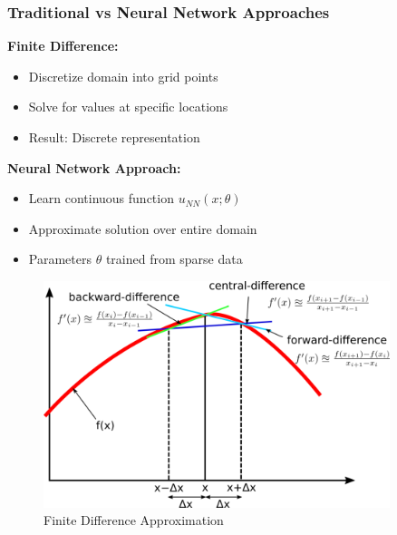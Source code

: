 \documentclass[notes]{beamer}
\begin{document}
\begin{frame}
\frametitle{Traditional vs Neural Network Approaches}

\begin{minipage}[t]{0.53\textwidth}
\textbf{Finite Difference:}
\begin{itemize}
\item Discretize domain into grid points
\item Solve for values at specific locations
\item Result: Discrete representation
\end{itemize}


\textbf{Neural Network Approach:}
\begin{itemize}
	\item Learn continuous function $u_{NN}(x; \theta)$
	\item Approximate solution over entire domain
	\item Parameters $\theta$ trained from sparse data
\end{itemize}


\end{minipage}
\hfill
\begin{minipage}[t]{0.43\textwidth}
\vspace{1em}
\begin{figure}[ht]
	\centering
	\includegraphics[width=0.9\textwidth]{figs/finite-difference-methods.png}
	\caption*{Finite Difference Approximation}
\end{figure}


\end{minipage}

\end{frame}
\end{document}
